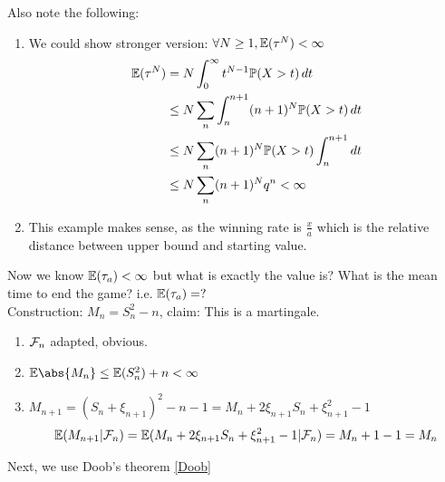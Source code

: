 \begin{rem}Also note the following:
\begin{enumerate}
    \item We could show stronger version: $\forall N\geq 1, \mathbb{E}(\tau^N)< \infty$ 
    \begin{align*}
        \mathbb{E}(\tau^N) &= N\int_0^\infty t^{N-1} \mathbb{P}(X > t) \mathop{}\!d t \\
        &\leq N \sum\limits_{n}\int_n^{n+1} (n+1)^N \mathbb{P}(X > t) \mathop{}\!d t \\
        &\leq N\sum\limits_{n} (n+1)^N \mathbb{P}(X > t) \int_n^{n+1} \mathop{}\!d t \\
        &\leq N\sum\limits_{n} (n+1)^N q^n <\infty
    \end{align*}
    \item This example makes sense, as the winning rate is $\frac{x}{a}$ which is the relative distance between upper bound and starting value.
\end{enumerate}
\end{rem}
\newpage
Now we know $\mathbb{E}(\tau_a) < \infty$ but what is exactly the value is? What is the mean time to end the game? i.e. $\mathbb{E}(\tau_a) =?$ \\
Construction: $M_n = S_n^2 - n$, claim: This is a martingale.
\begin{enumerate}
    \item $\mathcal{F}_n$ adapted, obvious.
    \item $\E\abs{M_n} \leq \E(S_n^2) + n < \infty$
    \item $M_{n+1} = (S_n + \xi_{n+1})^2 -n -1 = M_n + 2\xi_{n+1}S_n + \xi_{n+1}^2 -1$ 
    \begin{equation*}
        \mathbb{E}(M_{n+1} |\mathcal{F}_n) = \mathbb{E}(M_n + 2\xi_{n+1}S_n + \xi_{n+1}^2 -1|\mathcal{F}_n) = M_n + 1 -1 = M_n
    \end{equation*}
\end{enumerate}
Next, we use Doob's theorem \ref{Doob} 
